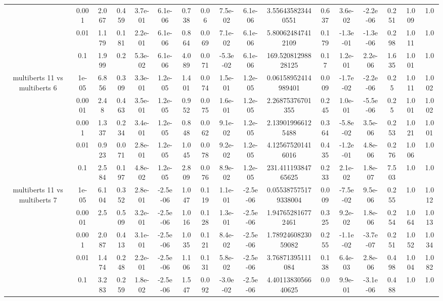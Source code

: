 \begin{tabular}{|c|c|c|c|c|c|c|c|c|c|c|c|c|c|c|c|c|}
 & 0.001 & 2.067 & 0.459 & 3.7e-01 & 6.1e-06 & 0.738 & 0.06 & 7.5e-02 & 6.1e-06 & 3.556435823440551 & 0.637 & 3.6e-02 & -2.2e-06 & 0.251 & 1.009 & 1.0 \\
 & 0.01 & 1.179 & 0.181 & 2.2e-01 & 6.1e-06 & 0.864 & 0.069 & 7.1e-02 & 6.1e-06 & 5.800624847412109 & 0.179 & -1.3e-01 & -1.3e-06 & 0.298 & 1.011 & 1.0 \\
 & 0.1 & 1.999 & 0.2 & 5.3e-02 & 6.1e-06 & 4.089 & 0.071 & -5.3e-02 & 6.1e-06 & 169.52081298828125 & 0.17 & 1.2e-01 & 2.2e-06 & 1.635 & 1.001 & 1.0 \\
\hline
\multirow{5}{*}{multiberts 11 vs multiberts 6} & 1e-05 & 6.856 & 0.309 & 3.3e-01 & 1.2e-05 & 1.401 & 0.074 & 1.5e-01 & 1.2e-05 & 0.06158952414989401 & 0.009 & -1.7e-02 & -2.2e-06 & 0.25 & 1.011 & 1.002 \\
 & 0.0001 & 2.48 & 0.463 & 3.5e-01 & 1.2e-05 & 0.952 & 0.075 & 1.6e-01 & 1.2e-05 & 2.26875376701355 & 0.245 & 1.0e-01 & -5.5e-06 & 0.25 & 1.001 & 1.002 \\
 & 0.001 & 1.337 & 0.234 & 3.4e-01 & 1.2e-05 & 0.848 & 0.062 & 9.1e-02 & 1.2e-05 & 2.139019966125488 & 0.364 & -5.8e-02 & 3.5e-06 & 0.253 & 1.021 & 1.001 \\
 & 0.01 & 0.923 & 0.071 & 2.8e-01 & 1.2e-05 & 1.045 & 0.078 & 9.2e-02 & 1.2e-05 & 4.125675201416016 & 0.435 & -1.2e-01 & 4.8e-06 & 0.276 & 1.006 & 1.0 \\
 & 0.1 & 2.584 & 0.197 & 4.8e-02 & 1.2e-05 & 2.809 & 0.076 & 8.9e-02 & 1.2e-05 & 231.41119384765625 & 0.233 & 2.1e-02 & 1.8e-07 & 7.503 & 1.0 & 1.0 \\
\hline
\multirow{5}{*}{multiberts 11 vs multiberts 7} & 1e-05 & 6.104 & 0.352 & 2.8e-01 & -2.5e-06 & 1.047 & 0.119 & 1.1e-01 & -2.5e-06 & 0.055387575179338004 & 0.009 & -7.5e-02 & 9.5e-06 & 0.255 & 1.0 & 1.012 \\
 & 0.0001 & 2.5 & 0.509 & 3.2e-01 & -2.5e-06 & 1.016 & 0.128 & 1.3e-01 & -2.5e-06 & 1.947652816772461 & 0.325 & 9.2e-02 & 1.8e-06 & 0.254 & 1.064 & 1.013 \\
 & 0.001 & 2.087 & 0.413 & 3.1e-01 & -2.5e-06 & 1.035 & 0.121 & 8.4e-02 & -2.5e-06 & 1.7892460823059082 & 0.255 & -1.1e-02 & -3.7e-07 & 0.251 & 1.052 & 1.034 \\
 & 0.01 & 1.474 & 0.248 & 2.2e-01 & -2.5e-06 & 1.106 & 0.131 & 5.8e-02 & -2.5e-06 & 3.76871395111084 & 0.138 & 6.4e-03 & 2.8e-06 & 0.498 & 1.004 & 1.082 \\
 & 0.1 & 3.283 & 0.259 & 1.8e-02 & -2.5e-06 & 1.547 & 0.092 & -3.0e-02 & -2.5e-06 & 4.4011383056640625 & 0.0 & 9.9e-01 & -3.1e-06 & 0.488 & 1.0 & 1.0 \\

\end{tabular}
